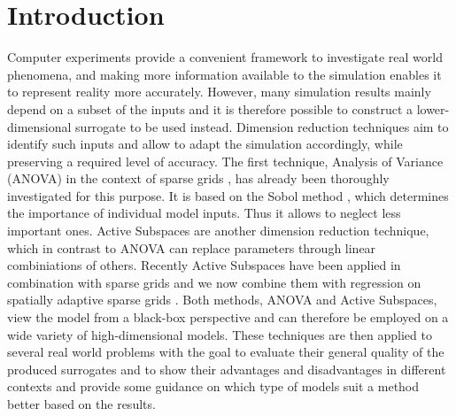 \documentclass[
  a4paper,  %
  twoside,  %
  bibliography=totoc,
  headsepline,
  cleardoublepage=empty,
  parskip=half,
  draft=false
]{scrbook}
\begin{document}


\renewcommand*{\chapterpagestyle}{scrplain}
\pagestyle{scrheadings}
\pagestyle{scrheadings}
\ihead[]{}
\chead[]{}
\ohead[]{\headmark}
\cfoot[]{}
\ifoot[]{}

































%
%

\setcounter{page}{1}

\chapter{Introduction}


Computer experiments provide a convenient framework to investigate real world phenomena, and making more information available to the simulation enables it to represent reality more accurately.
	However, many simulation results mainly depend on a subset of the inputs and it is therefore possible to construct a lower-dimensional surrogate to be used instead.
	Dimension reduction techniques aim to identify such inputs and allow to adapt the simulation accordingly, while preserving a required level of accuracy.
	The first technique, Analysis of Variance (ANOVA) in the context of sparse grids \cite{F10}, has already been thoroughly investigated for this purpose.
	It is based on the Sobol method \cite{S01}, which determines the importance of individual model inputs.
	 Thus it allows to neglect less important ones.
	Active Subspaces \cite{CG15} are another dimension reduction technique, which in contrast to ANOVA can replace parameters through linear combiniations of others.
	Recently Active Subspaces have been applied in combination with sparse grids and we now combine them with regression on spatially adaptive sparse grids \cite{P10}.
Both methods, ANOVA and Active Subspaces, view the model from a black-box perspective and can therefore be employed on a wide variety of high-dimensional models.
These techniques are then applied to several real world problems with the goal to evaluate their general quality of the produced surrogates and to show their advantages and disadvantages in different contexts and provide some guidance on which type of models suit a method better based on the results.
\end{document}

